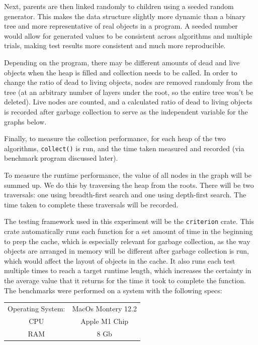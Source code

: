 \documentclass[index]{subfiles}
\begin{document}
Next, parents are then linked randomly to children using a seeded random generator. This makes the data structure slightly more dynamic than a binary tree and more representative of real objects in a program. A seeded number would allow for generated values to be consistent across algorithms and multiple trials, making test results more consistent and much more reproducible.

Depending on the program, there may be different amounts of dead and live objects when the heap is filled and collection needs to be called. In order to change the ratio of dead to living objects, nodes are removed randomly from the tree (at an arbitrary number of layers under the root, so the entire tree won't be deleted). Live nodes are counted, and a calculated ratio of dead to living objects is recorded after garbage collection to serve as the independent variable for the graphs below.

Finally, to measure the collection performance, for each heap of the two algorithms, \verb+collect()+ is run, and the time taken measured and recorded (via benchmark program discussed later).

To measure the runtime performance, the value of all nodes in the graph will be summed up. We do this by traversing the heap from the roots. There will be two traversals: one using breadth-first search and one using depth-first search. The time taken to complete these traversals will be recorded.

The testing framework used in this experiment will be the \verb+criterion+ crate. This crate automatically runs each function for a set amount of time in the beginning to prep the cache\cite{brookheislerAnalysisProcessCriterion}, which is especially relevant for garbage collection, as the way objects are arranged in memory will be different after garbage collection is run, which would affect the layout of objects in the cache. It also runs each test multiple times to reach a target runtime length, which increases the certainty in the average value that it returns for the time it took to complete the function\cite{brookheislerAnalysisProcessCriterion}.
The benchmarks were performed on a system with the following specs:

\begin{table}[H]
    \begin{tabular}{@{}cc@{}} \toprule
        Operating System: & MacOs Montery 12.2 \\
        CPU               & Apple M1 Chip      \\
        RAM               & 8 Gb
        \bottomrule
    \end{tabular}
\end{table}
\end{document}
